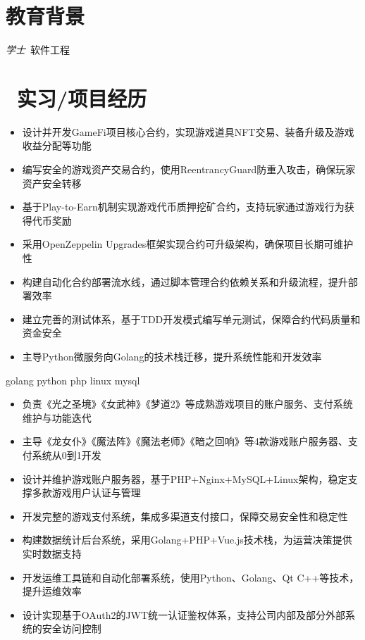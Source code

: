 \documentclass{resume}
\begin{document}


 
\section{\faGraduationCap  教育背景}
\textit{学士}\ 软件工程

\section{\faUsers\ 实习/项目经历}
\role{区块链后端开发}

\begin{itemize}
  \item 设计并开发GameFi项目核心合约，实现游戏道具NFT交易、装备升级及游戏收益分配等功能
  \item 编写安全的游戏资产交易合约，使用ReentrancyGuard防重入攻击，确保玩家资产安全转移
  \item 基于Play-to-Earn机制实现游戏代币质押挖矿合约，支持玩家通过游戏行为获得代币奖励
  \item 采用OpenZeppelin Upgrades框架实现合约可升级架构，确保项目长期可维护性
  \item 构建自动化合约部署流水线，通过脚本管理合约依赖关系和升级流程，提升部署效率
  \item 建立完善的测试体系，基于TDD开发模式编写单元测试，保障合约代码质量和资金安全
  \item 主导Python微服务向Golang的技术栈迁移，提升系统性能和开发效率
\end{itemize}


 {golang python php linux mysql}

\begin{itemize}
  \item 负责《光之圣境》《女武神》《梦道2》等成熟游戏项目的账户服务、支付系统维护与功能迭代
  \item 主导《龙女仆》《魔法阵》《魔法老师》《暗之回响》等4款游戏账户服务器、支付系统从0到1开发
  \item 设计并维护游戏账户服务器，基于PHP+Nginx+MySQL+Linux架构，稳定支撑多款游戏用户认证与管理
  \item 开发完整的游戏支付系统，集成多渠道支付接口，保障交易安全性和稳定性
  \item 构建数据统计后台系统，采用Golang+PHP+Vue.js技术栈，为运营决策提供实时数据支持
  \item 开发运维工具链和自动化部署系统，使用Python、Golang、Qt C++等技术，提升运维效率
  \item 设计实现基于OAuth2的JWT统一认证鉴权体系，支持公司内部及部分外部系统的安全访问控制
\end{itemize}
\end{document}
